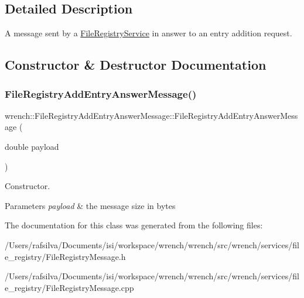 \subsection{Detailed Description}
A message sent by a \hyperlink{classwrench_1_1_file_registry_service}{File\+Registry\+Service} in answer to an entry addition request. 

\subsection{Constructor \& Destructor Documentation}
\mbox{\label{classwrench_1_1_file_registry_add_entry_answer_message_ac327ec85caa8f7a6917f42eabaf5f173}} 
\subsubsection{\texorpdfstring{File\+Registry\+Add\+Entry\+Answer\+Message()}{FileRegistryAddEntryAnswerMessage()}}
{\footnotesize\ttfamily wrench\+::\+File\+Registry\+Add\+Entry\+Answer\+Message\+::\+File\+Registry\+Add\+Entry\+Answer\+Message (\begin{DoxyParamCaption}\item[{double}]{payload }\end{DoxyParamCaption})}



Constructor. 


\begin{DoxyParams}{Parameters}
{\em payload} & the message size in bytes \\
\hline
\end{DoxyParams}


The documentation for this class was generated from the following files\+:\begin{DoxyCompactItemize}
\item 
/\+Users/rafsilva/\+Documents/isi/workspace/wrench/wrench/src/wrench/services/file\+\_\+registry/File\+Registry\+Message.\+h\item 
/\+Users/rafsilva/\+Documents/isi/workspace/wrench/wrench/src/wrench/services/file\+\_\+registry/File\+Registry\+Message.\+cpp\end{DoxyCompactItemize}
